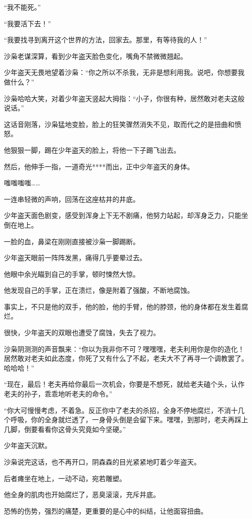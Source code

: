 \begin{this_body}
“我不能死。”

“我要活下去！”

“我要找寻到离开这个世界的方法，回家去。那里，有等待我的人！”

沙枭老谋深算，看到少年盗天脸色变化，嘴角不禁微微翘起。

少年盗天无畏地望着沙枭：“你之所以不杀我，无非是想利用我。说吧，你想要我做什么？”

沙枭哈哈大笑，对着少年盗天竖起大拇指：“小子，你很有种，居然敢对老夫这般说话。”

这话音刚落，沙枭猛地变脸，脸上的狂笑骤然消失不见，取而代之的是扭曲和愤怒。

他狠狠一脚，踢在少年盗天的脸上，将他一下子踢飞出去。

然后，他伸手一指，一道奇光****而出，正中少年盗天的身体。

嗤嗤嗤嗤……

一连串轻微的声响，回荡在这座枯井的井底。

少年盗天面色剧变，感受到浑身上下无不剧痛，他努力站起，却浑身乏力，只能坐倒在地上。

一脸的血，鼻梁在刚刚直接被沙枭一脚踢断。

少年盗天眼前一阵阵发黑，痛得几乎要晕过去。

他眼中余光瞄到自己的手掌，顿时悚然大惊。

他发现自己的手掌，正在溃烂，像是附着了强酸，不断地腐蚀。

事实上，不只是他的双手，他的脸，他的手臂，他的脖颈，他的身体都在发生着腐烂。

很快，少年盗天的双眼也遭受了腐蚀，失去了视力。

沙枭阴测测的声音飘来：“你以为我非你不可？嘿嘿嘿，老夫利用你是你的造化！居然敢对老夫如此态度，你死了又有什么了不起，老夫大不了再寻一个调教罢了。哈哈哈！”

“现在，最后！老夫再给你最后一次机会，你要是不想死，就给老夫磕个头，认作老夫的孙子，乖乖地听老夫的命令。”

“你大可慢慢考虑，不着急。反正你中了老夫的杀招，全身不停地腐烂，不消十几个呼吸，你的全身就烂透了，一身骨头倒是会留下来。嘿嘿，到那时，老夫再踩上几脚，倒要看看你这骨头究竟如今坚硬。”

少年盗天沉默。

沙枭说完这话，也不再开口，阴森森的目光紧紧地盯着少年盗天。

后者瘫坐在地上，一动不动，宛若雕塑。

他全身的肌肉也开始腐烂了，恶臭滚滚，充斥井底。

恐怖的伤势，强烈的痛楚，更重要的是心中的纠结，让他面容扭曲。


\end{this_body}
